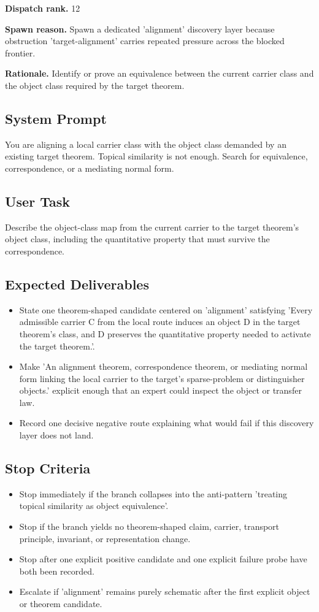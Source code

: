 \documentclass[11pt]{article}
\begin{document}
\textbf{Dispatch rank.} 12

\textbf{Spawn reason.} Spawn a dedicated 'alignment' discovery layer because obstruction 'target-alignment' carries repeated pressure across the blocked frontier.

\textbf{Rationale.} Identify or prove an equivalence between the current carrier class and the object class required by the target theorem.

\subsection*{System Prompt}
You are aligning a local carrier class with the object class demanded by an existing target theorem. Topical similarity is not enough. Search for equivalence, correspondence, or a mediating normal form.

\subsection*{User Task}
Describe the object-class map from the current carrier to the target theorem's object class, including the quantitative property that must survive the correspondence.

\subsection*{Expected Deliverables}
\begin{itemize}[leftmargin=*,itemsep=0.2em]
\item State one theorem-shaped candidate centered on 'alignment' satisfying 'Every admissible carrier C from the local route induces an object D in the target theorem's class, and D preserves the quantitative property needed to activate the target theorem.'.
\item Make 'An alignment theorem, correspondence theorem, or mediating normal form linking the local carrier to the target's sparse-problem or distinguisher objects.' explicit enough that an expert could inspect the object or transfer law.
\item Record one decisive negative route explaining what would fail if this discovery layer does not land.
\end{itemize}
\subsection*{Stop Criteria}
\begin{itemize}[leftmargin=*,itemsep=0.2em]
\item Stop immediately if the branch collapses into the anti-pattern 'treating topical similarity as object equivalence'.
\item Stop if the branch yields no theorem-shaped claim, carrier, transport principle, invariant, or representation change.
\item Stop after one explicit positive candidate and one explicit failure probe have both been recorded.
\item Escalate if 'alignment' remains purely schematic after the first explicit object or theorem candidate.
\end{itemize}
\end{document}
